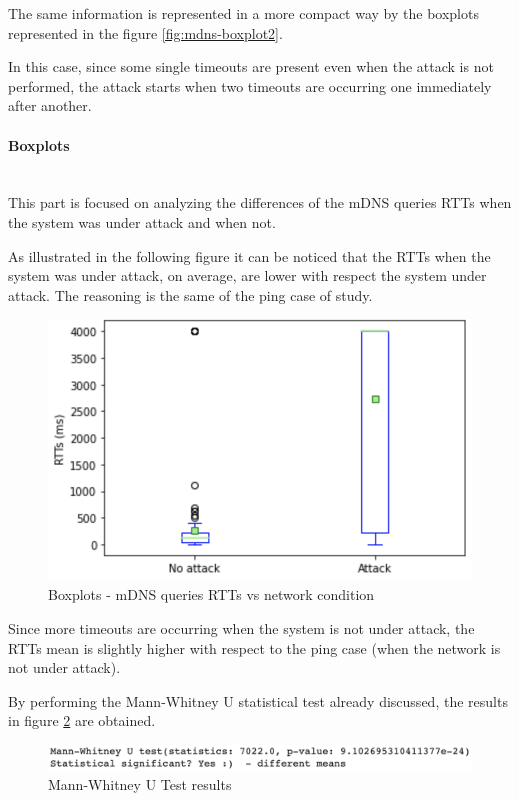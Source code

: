 \documentclass[fleqn, 11pt]{SelfArx} %
\begin{document}
The same information is represented in a more compact way by the boxplots represented in the figure \ref{fig:mdns-boxplot2}.

In this case, since some single timeouts are present even when the attack is not performed, the attack starts when two timeouts are occurring one immediately after another. 

\paragraph{Boxplots}\mbox{}\\
This part is focused on analyzing the differences of the mDNS queries RTTs when the system was under attack and when not.

As illustrated in the following figure it can be noticed that the RTTs when the system was under attack, on average, are lower with respect the system under attack.
The reasoning is the same of the ping case of study.

\begin{figure}\centering
    \includegraphics[width=\linewidth]{./mdns/mdns-boxplot1.png}
    \caption{Boxplots - mDNS queries RTTs vs network condition}
	\label{fig:mdns-boxplot1}
\end{figure}

Since more timeouts are occurring when the system is not under attack, the RTTs mean is slightly higher with respect to the ping case (when the network is not under attack).

By performing the Mann-Whitney U statistical test already discussed, the results in figure \ref{fig:mannwhitneyu2} are obtained.
\begin{figure}[H]\centering
    \includegraphics[width=\linewidth]{./mdns/mannwhitneyu2.png}
    \caption{Mann-Whitney U Test results}
	\label{fig:mannwhitneyu2}
\end{figure}
\end{document}
